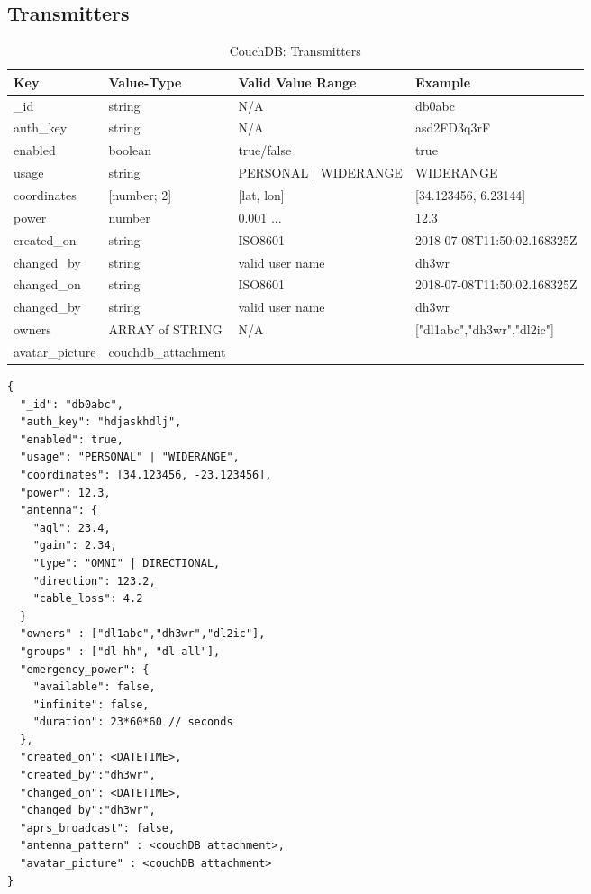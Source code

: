\subsection{Transmitters}
\begin{table}[h]
 \caption{CouchDB: Transmitters}
 \begin{tabular}{|l|l|l|l|}\hline
  Key & Value-Type & Valid Value Range & Example \\
  \hline
  \_id & string & N/A & db0abc \\
  auth\_key & string & N/A & asd2FD3q3rF \\
  enabled & boolean & true/false & true \\
  usage & string & PERSONAL | WIDERANGE & WIDERANGE \\
  coordinates & [number; 2]  & [lat, lon] & [34.123456, 6.23144] \\
  power & number & 0.001 ...  & 12.3 \\
  created\_on & string & ISO8601 & 2018-07-08T11:50:02.168325Z \\
  changed\_by & string & valid user name & dh3wr \\
  changed\_on & string & ISO8601 & 2018-07-08T11:50:02.168325Z \\
  changed\_by & string & valid user name & dh3wr \\
  owners & ARRAY of STRING & N/A & ["dl1abc","dh3wr","dl2ic"] \\
  avatar\_picture & couchdb\_attachment & & \\ \hline
  \end{tabular}
  \label{tab:couchdb:transmitters}
\end{table}

\begin{lstlisting}
{
  "_id": "db0abc",
  "auth_key": "hdjaskhdlj",
  "enabled": true,
  "usage": "PERSONAL" | "WIDERANGE",
  "coordinates": [34.123456, -23.123456],
  "power": 12.3,
  "antenna": {
    "agl": 23.4,
    "gain": 2.34,
    "type": "OMNI" | DIRECTIONAL,
    "direction": 123.2,
    "cable_loss": 4.2
  }
  "owners" : ["dl1abc","dh3wr","dl2ic"],
  "groups" : ["dl-hh", "dl-all"],
  "emergency_power": {
    "available": false,
    "infinite": false,
    "duration": 23*60*60 // seconds
  },
  "created_on": <DATETIME>,
  "created_by":"dh3wr",
  "changed_on": <DATETIME>,
  "changed_by":"dh3wr",
  "aprs_broadcast": false,
  "antenna_pattern" : <couchDB attachment>,
  "avatar_picture" : <couchDB attachment>
}
\end{lstlisting}


